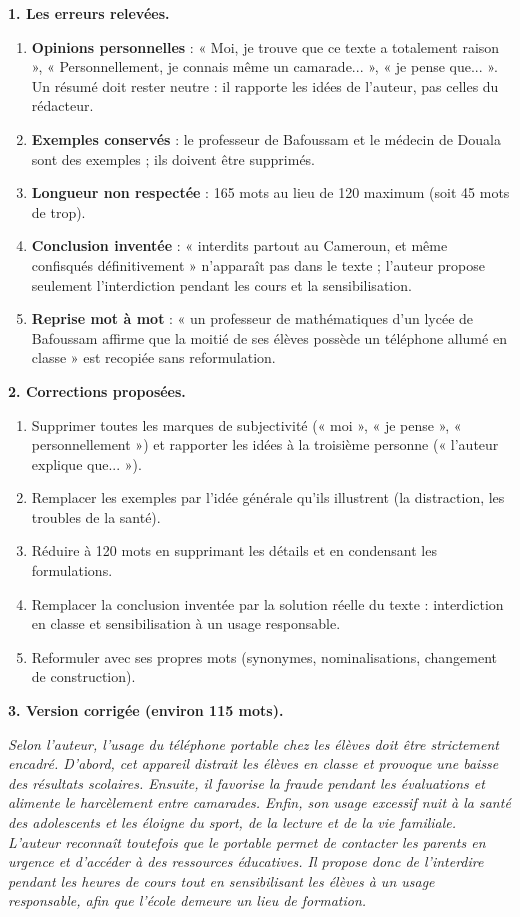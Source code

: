 \documentclass[11pt]{article}
\begin{document}
\begin{corrige}
\textbf{1. Les erreurs relevées.}
\begin{enumerate}
\item \textbf{Opinions personnelles} : « Moi, je trouve que ce texte a totalement raison », « Personnellement, je connais même un camarade... », « je pense que... ». Un résumé doit rester neutre : il rapporte les idées de l'auteur, pas celles du rédacteur.
\item \textbf{Exemples conservés} : le professeur de Bafoussam et le médecin de Douala sont des exemples ; ils doivent être supprimés.
\item \textbf{Longueur non respectée} : 165 mots au lieu de 120 maximum (soit 45 mots de trop).
\item \textbf{Conclusion inventée} : « interdits partout au Cameroun, et même confisqués définitivement » n'apparaît pas dans le texte ; l'auteur propose seulement l'interdiction pendant les cours et la sensibilisation.
\item \textbf{Reprise mot à mot} : « un professeur de mathématiques d'un lycée de Bafoussam affirme que la moitié de ses élèves possède un téléphone allumé en classe » est recopiée sans reformulation.
\end{enumerate}

\textbf{2. Corrections proposées.}
\begin{enumerate}
\item Supprimer toutes les marques de subjectivité (« moi », « je pense », « personnellement ») et rapporter les idées à la troisième personne (« l'auteur explique que... »).
\item Remplacer les exemples par l'idée générale qu'ils illustrent (la distraction, les troubles de la santé).
\item Réduire à 120 mots en supprimant les détails et en condensant les formulations.
\item Remplacer la conclusion inventée par la solution réelle du texte : interdiction en classe et sensibilisation à un usage responsable.
\item Reformuler avec ses propres mots (synonymes, nominalisations, changement de construction).
\end{enumerate}

\textbf{3. Version corrigée (environ 115 mots).}

\emph{Selon l'auteur, l'usage du téléphone portable chez les élèves doit être strictement encadré. D'abord, cet appareil distrait les élèves en classe et provoque une baisse des résultats scolaires. Ensuite, il favorise la fraude pendant les évaluations et alimente le harcèlement entre camarades. Enfin, son usage excessif nuit à la santé des adolescents et les éloigne du sport, de la lecture et de la vie familiale. L'auteur reconnaît toutefois que le portable permet de contacter les parents en urgence et d'accéder à des ressources éducatives. Il propose donc de l'interdire pendant les heures de cours tout en sensibilisant les élèves à un usage responsable, afin que l'école demeure un lieu de formation.}


\end{corrige}
\end{document}

